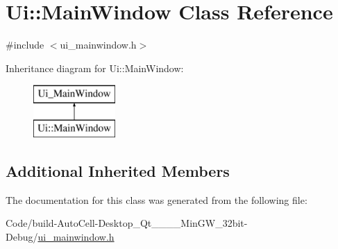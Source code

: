 \hypertarget{class_ui_1_1_main_window}{}\section{Ui\+:\+:Main\+Window Class Reference}
\label{class_ui_1_1_main_window}


{\ttfamily \#include $<$ui\+\_\+mainwindow.\+h$>$}

Inheritance diagram for Ui\+:\+:Main\+Window\+:\begin{figure}[H]
\begin{center}
\leavevmode
\includegraphics[height=2.000000cm]{class_ui_1_1_main_window}
\end{center}
\end{figure}
\subsection*{Additional Inherited Members}


The documentation for this class was generated from the following file\+:\begin{DoxyCompactItemize}
\item 
Code/build-\/\+Auto\+Cell-\/\+Desktop\+\_\+\+Qt\+\_\+\_\+\_\+\_\+\+Min\+G\+W\+\_\+32bit-\/\+Debug/\mbox{\hyperlink{ui__mainwindow_8h}{ui\+\_\+mainwindow.\+h}}\end{DoxyCompactItemize}

